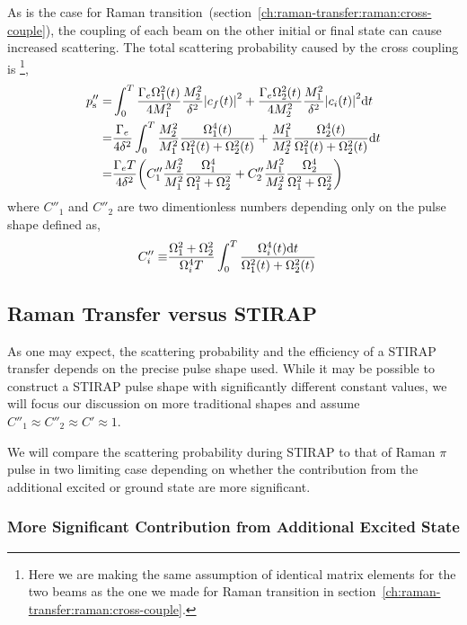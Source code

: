 As is the case for Raman transition~(section~\ref{ch:raman-transfer:raman:cross-couple}),
the coupling of each beam on the other initial or final state can cause increased scattering.
The total scattering probability caused by the cross coupling is
\footnote{Here we are making the same assumption of identical matrix elements for the two beams
  as the one we made for Raman transition in section~\ref{ch:raman-transfer:raman:cross-couple}.},
\begin{align*}
  p''_{\mathrm{s}}=&\int_0^T \frac{\Gamma_e\Omega_1^2(t)}{4M_1^2}\frac{M_2^2}{\delta^2}{\left|{c_f(t)}\right|}^2+\frac{\Gamma_e\Omega_2^2(t)}{4M_2^2}\frac{M_1^2}{\delta^2}{\left|{c_i(t)}\right|}^2 \mathrm{d} t\\
  =&\frac{\Gamma_e}{4\delta^2}\int_0^T \frac{M_2^2}{M_1^2}\frac{\Omega_1^4(t)}{\Omega_1^2(t)+\Omega_2^2(t)}+\frac{M_1^2}{M_2^2}\frac{\Omega_2^4(t)}{\Omega_1^2(t)+\Omega_2^2(t)} \mathrm{d} t\\
  =&\frac{\Gamma_eT}{4\delta^2}{\left({C''_1\frac{M_2^2}{M_1^2}\frac{\Omega_1^4}{\Omega_1^2+\Omega_2^2}+C''_2\frac{M_1^2}{M_2^2}\frac{\Omega_2^4}{\Omega_1^2+\Omega_2^2}}\right)}
\end{align*}
where $C''_1$ and $C''_2$ are two dimentionless numbers
depending only on the pulse shape defined as,
\begin{align*}
  C''_i\equiv&\frac{\Omega_1^2+\Omega_2^2}{\Omega_i^4T}\int_0^T \frac{\Omega_i^4(t) \mathrm{d} t}{\Omega_1^2(t)+\Omega_2^2(t)}
\end{align*}

\subsection{Raman Transfer versus STIRAP}
\label{ch:raman-transfer:stirap:raman-vs-stirap}

As one may expect, the scattering probability and the efficiency of a STIRAP transfer
depends on the precise pulse shape used.
While it may be possible to construct a STIRAP pulse shape
with significantly different constant values,
we will focus our discussion on more traditional shapes and assume
$C''_1\approx C''_2\approx C'\approx1$.

We will compare the scattering probability during STIRAP to that of
Raman $\pi$ pulse in two limiting case depending on whether the contribution
from the additional excited or ground state are more significant.

\subsubsection{More Significant Contribution from Additional Excited State}
\label{ch:raman-transfer:stirap:raman-vs-stirap:extra-ext}


